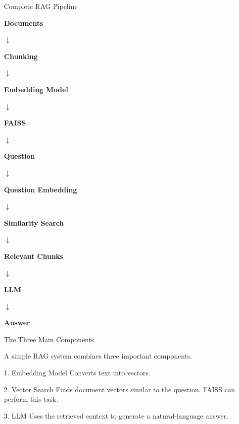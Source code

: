 \documentclass[aspectratio=169]{beamer}
\begin{document}
\begin{frame}{Complete RAG Pipeline}

\begin{center}
\Large

\textbf{Documents}

$\downarrow$

\textbf{Chunking}

$\downarrow$

\textbf{Embedding Model}

$\downarrow$

\textbf{FAISS}

$\downarrow$

\textbf{Question}

$\downarrow$

\textbf{Question Embedding}

$\downarrow$

\textbf{Similarity Search}

$\downarrow$

\textbf{Relevant Chunks}

$\downarrow$

\textbf{LLM}

$\downarrow$

\textbf{Answer}

\end{center}

\end{frame}

\begin{frame}{The Three Main Components}

A simple RAG system combines three important components.

\begin{block}{1. Embedding Model}
Converts text into vectors.
\end{block}

\begin{block}{2. Vector Search}
Finds document vectors similar to the question.
FAISS can perform this task.
\end{block}

\begin{block}{3. LLM}
Uses the retrieved context to generate a natural-language answer.
\end{block}

\end{frame}
\end{document}
